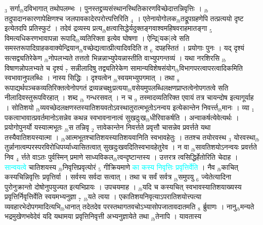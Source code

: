 \documentclass[article,12pt,a4paper]{memoir}%
\newcommand{\quotelemma}[1]{\textcolor{cyan}{#1}}
\begin{document}
{\tiny $_{3}$} सर्गा{\tiny $_{lb}$}दविभागात् तथोपलम्भः । पुनस्तद्द्रव्यसंस्थानस्थितिकारणविच्छेदात्तन्निवृत्तिः । {\tiny $_{lb}$}तदुपादानकारणापेक्षिणश्च जलपावकादेरपरोत्त्पत्तिरिति {\tiny $_{4}$} । एतेनायोगोलक{\tiny $_{lb}$}तद्रूपग्रहणेपि तत्प्रत्ययो दृष्ट इत्येतदपि प्रतिस्फुटं । तदेवं द्रव्यस्य प्रत्य{\tiny $_{lb}$}क्षत्वासिद्धेर्यदुक्तङ्गवाश्वमहिषवराहमातङ्गा {\tiny $_{5}$} विमत्यधिकरणभावापन्ना रूपादि{\tiny $_{lb}$}व्यतिरिक्ता इत्येव घोषणा । ऐन्द्रि[यक]त्वे सति समस्तरूपादिग्राहकवाक्येन्द्रियान{\tiny $_{lb}$}वच्छेद्यत्वात्प्रीत्यादिवदिति त {\tiny $_{6}$} दपहस्तितं । प्रयोगाः पुनः । यद् दृश्यं सत्सद्व्यतिरेकेण {\tiny $_{lb}$}नोपलभ्यते तत्ततो भिन्नन्नाभ्युपेयन्नास्तीति वाभ्युपगन्तव्यं । यथा नरशिरसि {\tiny $_{lb}$}विषाणन्नोपलभ्यते च दृश्यं {\tiny $_{7}$} सन्नीलादिषु तद्व्यतिरेकेण सामान्यविशेषसंयोग{\tiny $_{lb}$}विभागपरत्वापरत्वादिकमिति स्वभावानुपलब्धिः । नास्य सिद्धिः । दृश्यत्वेन {\tiny $_{lb}$}स्वयमभ्युपगमात् । तथा {\tiny $_{8}$} रूपाद्यर्थपञ्चकव्यतिरिक्तत्वेनोपगतं द्रव्यन्नचक्षुःप्रत्यया{\tiny $_{lb}$}वसेयमुपलब्धिलक्षणप्राप्तत्वेनोपगतत्वे सति नीलादिवस्तुरूपविरहात् । शब्द {\tiny $_{lb}$} \leavevmode{} गन्धरसवत् । न च {\tiny $_{9}$} \leavevmode{} तस्मादव्यतिरिक्त एवायं तत्र चायन्दोष इत्यागूर्याह । सोतिशयो {\tiny $_{lb}$}व्यवच्छेदलक्षणस्तस्यातिशयवतोऽवस्थातुरात्मभूतोऽनन्वय इत्येकान्तेन निवर्त्त्त{\tiny $_{lb}$}मानः । व्या {\tiny $_{1}$} पकत्वाभावात्प्रवर्तमानोऽसन्नेव कथन्न स्वभावनानात्वं सुखदुःख{\tiny $_{lb}$}धीरिवाकर्षति । अन्वाकर्षत्येवेत्यर्थः ।प्रयोगोपुनर्यो यस्यात्मभूतः {\tiny $_{lb}$}स तन्निवृ {\tiny $_{2}$} त्तावेकान्तेन निवर्त्तते प्रवृत्तौ चासन्नेव प्रवर्त्तते यथा तस्यैवातिशयस्यात्मा । {\tiny $_{lb}$}आत्मभूतश्चातिशयस्यातिशयवानिति स्वभावहेतुः । ततश्च तयोरवस्थ {\tiny $_{3}$} योरवस्था{\tiny $_{lb}$}तुर्न्नानात्वम्परस्परविरोधिपर्य्याध्यासितत्वात् सुखदुःखवदितिस्वभावहेतुरेव । न वा {\tiny $_{lb}$}सावतिशयोऽनन्वयः प्रवर्त्तते निव {\tiny $_{4}$} र्त्तते वाऽतः पुर्वस्मिन् प्रमाणे साध्यविकल{\tiny $_{lb}$}त्वन्दृष्टान्तस्य । उत्तरत्र त्वसिद्धिर्हेतोरिति चेदाह । \quotelemma{सान्वयत्वे} चातिशयस्य {\tiny $_{lb}$}निवृत्तिप्रवृत्योरं {\tiny $_{5}$} गीक्रियमाणे \quotelemma{का कस्य निवृत्तिः प्रवृत्तिर्वेति} \cite[4b4]{vn-msN} । नैव {\tiny $_{lb}$}काचित् कस्यचिन्निवृत्तिः प्रवृत्तिर्वा । सर्वस्य सर्वदा सत्वात् । तथा च सर्वं सर्वत्र {\tiny $_{lb}$}समुपयु {\tiny $_{6}$} ज्येतेत्यादिना पुरोनुक्रान्तो दोषोनुपयुज्यत इत्यभिप्रायः । उपचयमाह । {\tiny $_{lb}$}यदि च कस्यचित् स्वभावस्यातिशयाख्यस्य प्रवृत्तिर्निवृत्तिर्वेति स्वयमभ्यनुज्ञा {\tiny $_{7}$} {\tiny $_{lb}$}यते त्वया । एकातिशयनिवृत्याऽपरातिशयोत्त्पत्या व्यवहारभेदोपगमादित्यभि{\tiny $_{lb}$}धानात् तदेतदेव परस्तथागतवचोऽभ्यासोपजातावदातमति {\tiny $_{8}$} र्ब्रुवाणः । नानु{\tiny $_{lb}$}मन्यते भद्रमुखेणभवेदेवं यदि यथामया प्रवृत्तिनिवृत्ती अभ्यनुज्ञायेते तथा {\tiny $_{lb}$}तेनापि । यावतास्य 
\end{document}
